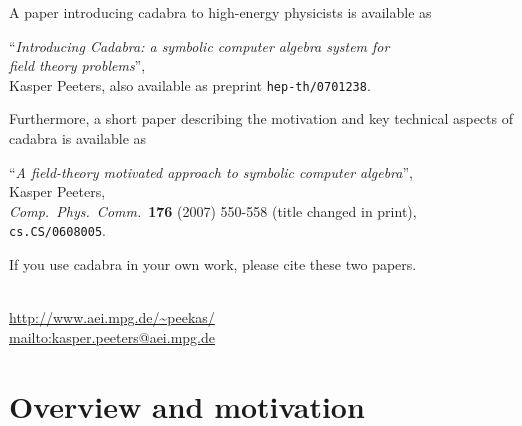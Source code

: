 \documentclass[11pt]{article}
\newcommand{\cdb}{{cadabra}\xspace}
\numberwithin{equation}{section}
\begin{document}
\noindent A paper introducing \cdb to high-energy physicists is
available as
\begin{center}
\begin{minipage}{.8\textwidth}
``\emph{Introducing Cadabra: a symbolic computer algebra system for\\
	 field theory problems}'',\\
Kasper Peeters,
also available as preprint {\tt hep-th/0701238}.
\end{minipage}
\end{center}
Furthermore, a short paper describing the motivation and key technical
aspects of \cdb is available as
\begin{center}
\begin{minipage}{.8\textwidth}
``\emph{A field-theory motivated approach to symbolic computer algebra}'',\\
Kasper Peeters,\\
\emph{Comp.~Phys.~Comm.}~{\bf 176} (2007) 550-558 (title changed in print),\\
{\tt cs.CS/0608005}.\\
\end{minipage}
\end{center}
If you use \cdb in your own work, please cite these two papers.


\vfill
{}\\[3ex]
\url{http://www.aei.mpg.de/~peekas/}\\[1ex]
\url{mailto:kasper.peeters@aei.mpg.de}
\newpage

\pagestyle{empty}
\tableofcontents
\cleardoublepage
\pagestyle{fancy}

\section{Overview and motivation}
\end{document}
